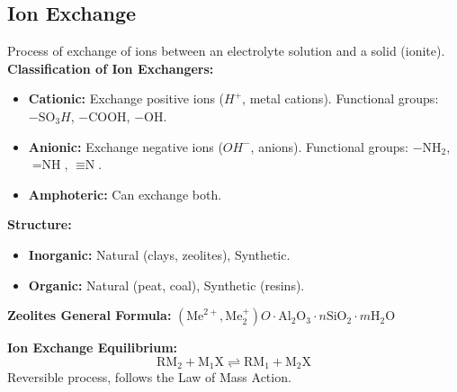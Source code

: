 \subsection{Ion Exchange}
Process of exchange of ions between an electrolyte solution and a solid (ionite).
\textbf{Classification of Ion Exchangers:}
\begin{itemize}
    \item \textbf{Cationic:} Exchange positive ions ($H^+$, metal cations). Functional groups: $-\text{SO}_3H$, $-\text{COOH}$, $-\text{OH}$.
    \item \textbf{Anionic:} Exchange negative ions ($OH^-$, anions). Functional groups: $-\text{NH}_2$, $=\text{NH}$, $\equiv\text{N}$.
    \item \textbf{Amphoteric:} Can exchange both.
\end{itemize}
\textbf{Structure:}
\begin{itemize}
    \item \textbf{Inorganic:} Natural (clays, zeolites), Synthetic.
    \item \textbf{Organic:} Natural (peat, coal), Synthetic (resins).
\end{itemize}
\textbf{Zeolites General Formula:} $(\text{Me}^{2+}, \text{Me}_2^+)O \cdot \text{Al}_2\text{O}_3 \cdot n\text{SiO}_2 \cdot m\text{H}_2\text{O}$

\textbf{Ion Exchange Equilibrium:}
\begin{equation}
    \text{RM}_2 + \text{M}_1\text{X} \rightleftharpoons \text{RM}_1 + \text{M}_2\text{X}
\end{equation}
Reversible process, follows the Law of Mass Action.
\vspace{0.2cm}